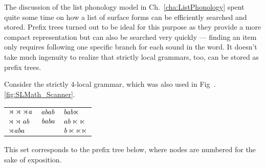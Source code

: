 The discussion of the list phonology model in Ch.~\ref{cha:ListPhonology} spent quite some time on how a list of surface forms can be efficiently searched and stored.
Prefix trees turned out to be ideal for this purpose as they provide a more compact representation but can also be searched very quickly --- finding an item only requires following one specific branch for each sound in the word.
It doesn't take much ingenuity to realize that strictly local grammars, too, can be stored as prefix trees.
%
\begin{examplebox}
    Consider the strictly $4$-local grammar, which was also used in Fig~.\ref{fig:SLMath_Scanner}.
    \label{ex:SLImplement_PrefixTree}
    \begin{center}
        \begin{tabular}{lll}
            $\mathit{\rtimes \rtimes \rtimes a}$
            &
            $\mathit{a b a b}$
            &
            $\mathit{b a b \ltimes}$
            \\
            $\mathit{\rtimes \rtimes a b}$
            &
            $\mathit{b a b a}$
            &
            $\mathit{a b \ltimes \ltimes}$
            \\
            $\mathit{\rtimes a b a}$
            &
            &
            $\mathit{b \ltimes \ltimes \ltimes}$
        \end{tabular}
    \end{center}
    This set corresponds to the prefix tree below, where nodes are numbered for the sake of exposition.
    

\end{examplebox}
